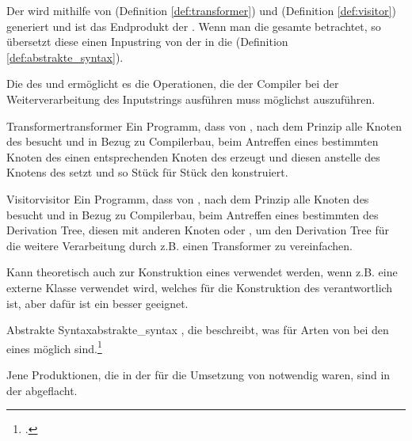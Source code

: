 
Der  wird mithilfe von  (Definition \ref{def:transformer}) und  (Definition \ref{def:visitor}) generiert und ist das Endprodukt der . Wenn man die gesamte  betrachtet, so übersetzt diese einen Inpustring von der  in die  (Definition \ref{def:abstrakte_syntax}).

Die  des  und   ermöglicht es die Operationen, die der Compiler bei der Weiterverarbeitung des Inputstrings ausführen muss möglichst  auszuführen.

\begin{Definition}{Transformer}{transformer}
Ein Programm, dass von , nach dem  Prinzip alle Knoten des  besucht und in Bezug zu Compilerbau, beim Antreffen eines bestimmten Knoten des  einen entsprechenden Knoten des  erzeugt und diesen anstelle des Knotens des  setzt und so Stück für Stück den  konstruiert.
\end{Definition}

\begin{Definition}{Visitor}{visitor}
Ein Programm, dass von , nach dem  Prinzip alle Knoten des  besucht und in Bezug zu Compilerbau, beim Antreffen eines bestimmten  des Derivation Tree, diesen  mit anderen Knoten  oder , um den Derivation Tree für die weitere Verarbeitung durch z.B. einen Transformer zu vereinfachen.

Kann theoretisch auch zur Konstruktion eines  verwendet werden, wenn z.B. eine externe Klasse verwendet wird, welches für die Konstruktion des  verantwortlich ist, aber dafür ist ein  besser geeignet.
\end{Definition}

\begin{Definition}{Abstrakte Syntax}{abstrakte_syntax}
  , die beschreibt, was für Arten von  bei den  eines  möglich sind.\footcite{noauthor_course_2022}

  Jene Produktionen, die in der  für die Umsetzung von  notwendig waren, sind in der  abgeflacht.
\end{Definition}

